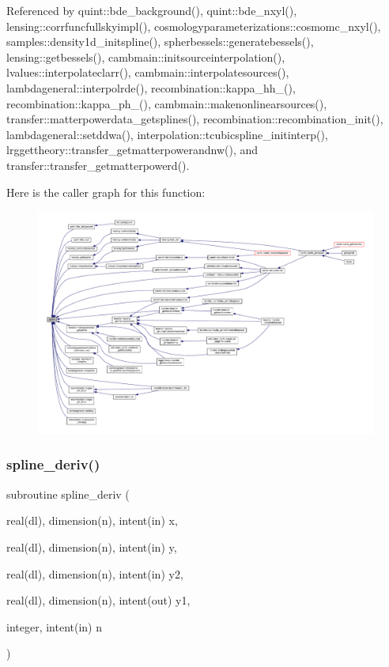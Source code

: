 Referenced by quint\+::bde\+\_\+background(), quint\+::bde\+\_\+nxyl(), lensing\+::corrfuncfullskyimpl(), cosmologyparameterizations\+::cosmomc\+\_\+nxyl(), samples\+::density1d\+\_\+initspline(), spherbessels\+::generatebessels(), lensing\+::getbessels(), cambmain\+::initsourceinterpolation(), lvalues\+::interpolateclarr(), cambmain\+::interpolatesources(), lambdageneral\+::interpolrde(), recombination\+::kappa\+\_\+hh\+\_\+21cm(), recombination\+::kappa\+\_\+ph\+\_\+21cm(), cambmain\+::makenonlinearsources(), transfer\+::matterpowerdata\+\_\+getsplines(), recombination\+::recombination\+\_\+init(), lambdageneral\+::setddwa(), interpolation\+::tcubicspline\+\_\+initinterp(), lrggettheory\+::transfer\+\_\+getmatterpowerandnw(), and transfer\+::transfer\+\_\+getmatterpowerd().

Here is the caller graph for this function\+:
\nopagebreak
\begin{figure}[H]
\begin{center}
\leavevmode
\includegraphics[width=350pt]{subroutines_8f90_af4fbf8a987590628c9a9d08152ce9e08_icgraph}
\end{center}
\end{figure}
\mbox{\label{subroutines_8f90_a481cbd4b768cbe245fdfe71380927e5a}} 
\subsubsection{\texorpdfstring{spline\+\_\+deriv()}{spline\_deriv()}}
{\footnotesize\ttfamily subroutine spline\+\_\+deriv (\begin{DoxyParamCaption}\item[{real(dl), dimension(n), intent(in)}]{x,  }\item[{real(dl), dimension(n), intent(in)}]{y,  }\item[{real(dl), dimension(n), intent(in)}]{y2,  }\item[{real(dl), dimension(n), intent(out)}]{y1,  }\item[{integer, intent(in)}]{n }\end{DoxyParamCaption})}

